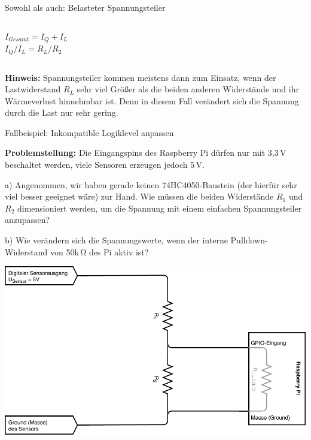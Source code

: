{\begin{frame}{Sowohl als auch: Belasteter Spannungsteiler}
\begin{columns}
        \bigskip

        $I_{Gesamt} = I_Q + I_L$ \\
        \smallskip
        $I_Q / I_L = R_L / R_2$ \\
    \end{columns}

    \bigskip

    \parbox{\linewidth}{
        \footnotesize
        \textbf{Hinweis:} Spannungsteiler kommen meistens dann zum Einsatz, wenn der
        Lastwiderstand $R_L$ sehr viel Größer als die beiden anderen Widerstände und
        ihr Wärmeverlust hinnehmbar ist. Denn in diesem Fall verändert sich die Spannung
        durch die Last nur sehr gering.
    }
\end{frame}
}

{
\footnotesize

\begin{frame}{Fallbeispiel: Inkompatible Logiklevel anpassen}
    \parbox{\textwidth}{
        \textbf{Problemstellung:} Die Eingangspins des Raspberry Pi dürfen nur mit
        3,3\,V beschaltet werden, viele Sensoren erzeugen jedoch 5\,V.
    }

    \smallskip

    \parbox{\textwidth}{
        a) Angenommen, wir haben gerade keinen 74HC4050-Baustein (der hierfür sehr
        viel besser geeignet wäre) zur Hand. Wie müssen die beiden Widerstände
        $R_1$ und $R_2$ dimensioniert werden, um die Spannung mit einem einfachen
        Spannungsteiler anzupassen?
    }

    \smallskip

    \parbox{\textwidth}{
        b) Wie verändern sich die Spannungswerte, wenn der interne Pulldown-Widerstand von
        50k\,\si{\ohm} des Pi aktiv ist?
    }

    \begin{center}
        \includegraphics[width=.7\textwidth]{2-hardwaredesign/img/spannungsteiler_beispiel}
    \end{center}


\end{frame}}
